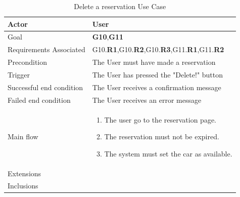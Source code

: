 \newline
\begin{table}[htb]
\begin{center}
\renewcommand{\arraystretch}{1.5}
\begin{tabular}{|l|p{}|}
\hline
Actor & User \\ \hline
Goal & \textbf{G10},\textbf{G11} \\ \hline
Requirements Associated & G10.\textbf{R1},G10.\textbf{R2},G10.\textbf{R3},G11.\textbf{R1},G11.\textbf{R2} \\ \hline
Precondition & The User must have made a reservation \\ \hline
Trigger & The User has pressed the "Delete!" button \\ \hline
Successful end condition & The User receives a confirmation message \\ \hline
Failed end condition & The User receives an error message \\ \hline
Main flow & \begin{minipage}[t]{0.6\textwidth}
\begin{enumerate}
\addtolength{\itemindent}{0.5cm}
\item The user go to the reservation page.
\item The reservation must not be expired.
\item The system must set the car as available. 
\end{enumerate}
\end{minipage} \\ \hline
Extensions & \\ \hline
Inclusions & \\ \hline
\end{tabular}
\caption{Delete a reservation Use Case}
\end{center}
\end{table}
\clearpage

